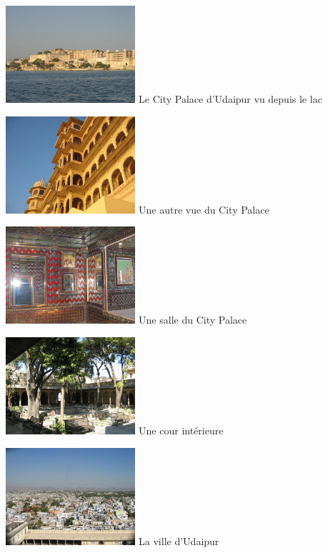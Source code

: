\begin{multicols}{2}
\hspace*{-0.65cm}
\includegraphics[width=4.8cm]{articles/Il-commence-a-faire-chaud/palacelac.jpg}
Le City Palace d'Udaipur vu depuis le lac

\hspace*{-0.65cm}
\includegraphics[width=4.8cm]{articles/Il-commence-a-faire-chaud/citylac2.jpg}
Une autre vue du City Palace

\hspace*{-0.65cm}
\includegraphics[width=4.8cm]{articles/Il-commence-a-faire-chaud/citysalle.jpg}
Une salle du City Palace

\hspace*{-0.65cm}
\includegraphics[width=4.8cm]{articles/Il-commence-a-faire-chaud/citycours.jpg}
Une cour intérieure

\hspace*{-0.65cm}
\includegraphics[width=4.8cm]{articles/Il-commence-a-faire-chaud/udaipur.jpg}
La ville d'Udaipur


\end{multicols}
